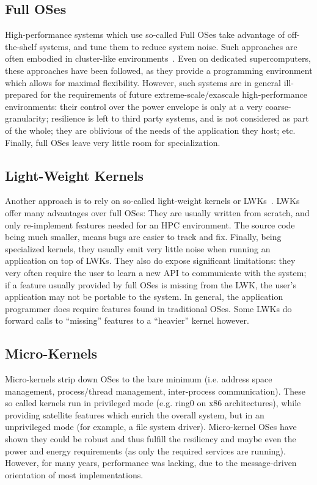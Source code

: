     \subsection{Full OSes}
        High-performance systems which use so-called Full OSes take advantage of off-the-shelf systems, and tune them to reduce system noise. Such approaches are often embodied in cluster-like environments~\cite{SterlingEtAl95}. Even on dedicated supercomputers, these approaches have been followed, as they provide a programming environment which allows for maximal flexibility. However, such systems are in general ill-prepared for the requirements of future extreme-scale/exascale high-performance environments: their control over the power envelope is only at a very coarse-granularity; resilience is left to third party systems, and is not considered as part of the whole; they are oblivious of the needs of the application they host; etc. Finally, full OSes leave very little room for specialization.

    \subsection{Light-Weight Kernels}
        Another approach is to rely on so-called light-weight kernels or LWKs~\cite{GiampapaEtAl10, BallesterosEtAl12}. LWKs offer many advantages over full OSes: They are usually written from scratch, and only re-implement features needed for an HPC environment. The source code being much smaller, means bugs are easier to track and fix. Finally, being specialized kernels, they usually emit very little noise when running an application on top of LWKs. They also do expose significant limitations: they very often require the user to learn a new API to communicate with the system; if a feature usually provided by full OSes is missing from the LWK, the user's application may not be portable to the system. In general, the application programmer does require features found in traditional OSes. Some LWKs do forward calls to ``missing'' features to a  ``heavier'' kernel however. %

    \subsection{Micro-Kernels}
        Micro-kernels strip down OSes to the bare minimum (i.e. address space management, process/thread management, inter-process communication). These so called kernels run in privileged mode (e.g. ring0 on x86 architectures), while providing satellite features which enrich the overall system, but in an unprivileged mode (for example, a file system driver). Micro-kernel OSes have shown they could be robust and thus fulfill the resiliency and maybe even the power and energy requirements (as only the required services are running). However, for many years, performance was lacking, due to the message-driven orientation of most implementations. 

